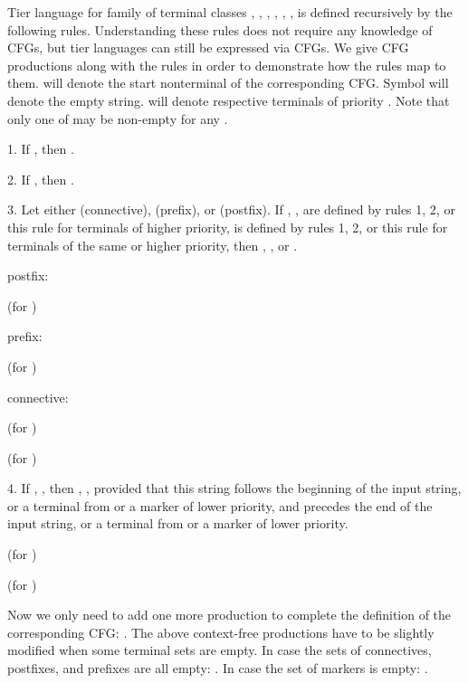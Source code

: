 \documentclass{llncs}
\begin{document}
Tier language  for family of terminal classes , , , , , ,  is defined recursively by the following rules. Understanding these rules does not require any knowledge of CFGs, but tier languages can still be expressed via CFGs. We give CFG productions along with the rules in order to demonstrate how the rules map to them.  will denote the start nonterminal of the corresponding CFG. Symbol  will denote the empty string.  will denote respective terminals of priority . Note that only one of  may be non-empty for any .

1. If , then .

\noindent


2. If , then  .

\noindent


\noindent


\noindent


3. Let either  (connective),  (prefix), or  (postfix). If , ,  are defined by rules 1, 2, or this rule for terminals of higher priority,  is defined by rules 1, 2, or this rule for terminals of the same or higher priority, then , , or .

\noindent


postfix:

\noindent
 (for )

\noindent 


\noindent


prefix:

\noindent
 (for )

\noindent


connective:

\noindent
 (for )

\noindent


\noindent
 (for )

\noindent
 

4. If , , then , ,  provided that this string follows the beginning of the input string, or a terminal from  or a marker of lower priority, and precedes the end of the input string, or a terminal from  or a marker of lower priority.

\noindent
 (for )

\noindent


\noindent
 (for )

\noindent


\noindent


Now we only need to add one more production to complete the definition of the corresponding CFG: 
.
The above context-free productions have to be slightly modified when some terminal sets are empty. In case the sets of connectives, postfixes, and prefixes are all empty:
.
In case the set of markers is empty:
.
\end{document}
